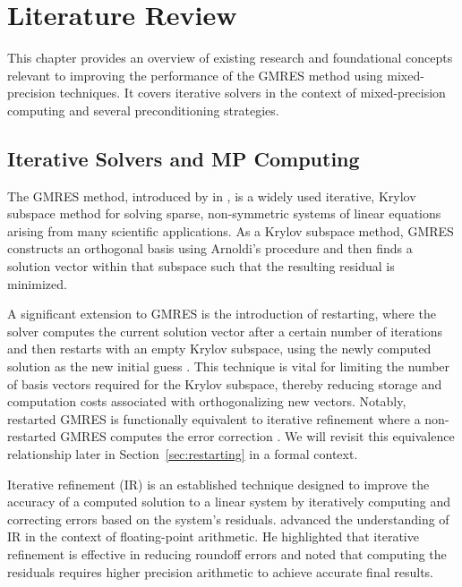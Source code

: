 \chapter{Literature Review}
\label{cha:literature-review}

This chapter provides an overview of existing research and foundational concepts
relevant to improving the performance of the GMRES method using mixed-precision
techniques. It covers iterative solvers in the context of mixed-precision
computing and several preconditioning strategies.

\section{Iterative Solvers and MP Computing}
\label{sec:iterative-solvers}

The GMRES method, introduced by \textcite{saad_gmres_1986} in
\citeyear{saad_gmres_1986}, is a widely used iterative, Krylov subspace method
for solving sparse, non-symmetric systems of linear equations arising from many
scientific applications. As a Krylov subspace method, GMRES constructs an
orthogonal basis using Arnoldi’s procedure and then finds a solution vector
within that subspace such that the resulting residual is minimized.

A significant extension to GMRES is the introduction of restarting, where the
solver computes the current solution vector after a certain number of iterations
and then restarts with an empty Krylov subspace, using the newly computed
solution as the new initial guess \cite{lindquist_improving_2020}. This
technique is vital for limiting the number of basis vectors required for the
Krylov subspace, thereby reducing storage and computation costs associated with
orthogonalizing new vectors. Notably, restarted GMRES is functionally equivalent
to iterative refinement where a non-restarted GMRES computes the error
correction \cite{lindquist_improving_2020,mary_mixed_2023}. We will revisit this
equivalence relationship later in Section~\ref{sec:restarting} in a formal
context.

Iterative refinement (IR) is an established technique designed to improve the
accuracy of a computed solution to a linear system by iteratively computing and
correcting errors based on the system's residuals.
\textcite{moler_iterative_1967} advanced the understanding of IR in the context
of floating-point arithmetic. He highlighted that iterative refinement is
effective in reducing roundoff errors and noted that computing the residuals
requires higher precision arithmetic to achieve accurate final results.

